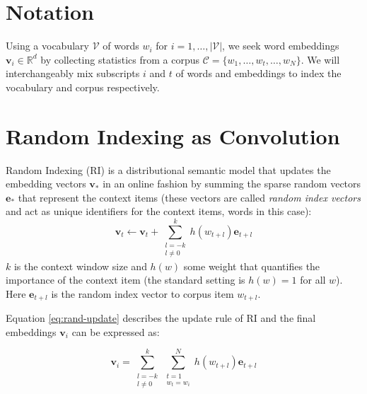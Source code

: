 \documentclass[11pt]{article}
\begin{document}
\section{Notation}

Using a vocabulary $\mathcal{V}$ of words $w_i$ for $i=1,\dots,|\mathcal{V}|$, we seek word embeddings $\textbf{v}_i \in \mathbb{R}^d$ by collecting statistics from a corpus $\mathcal{C} = \{w_1, \dots, w_t, \dots, w_N\}$. We will interchangeably mix subscripts $i$ and $t$ of words and embeddings to index the vocabulary and corpus respectively.

\section{Random Indexing as Convolution}

Random Indexing (RI) \cite{Kanerva:2000,Kanerva:2009} is a distributional semantic model that updates the embedding vectors $\textbf{v}_*$ in an online fashion by summing the sparse random vectors $\textbf{e}_*$ that represent the context items (these vectors are called {\em random index vectors} and act as unique identifiers for the context items, words in this case):
\begin{equation}
    \label{eq:rand-update}
    \textbf{v}_t \leftarrow \textbf{v}_t + \sum_{\substack{l = -k\\l\neq 0}}^{k} h(w_{t+l})\textbf{e}_{t+l}
\end{equation}
$k$ is the context window size and $h(w)$ some weight that quantifies the importance of the context item (the standard setting is $h(w)=1$ for all $w$). Here $\textbf{e}_{t+l}$ is the random index vector to corpus item $w_{t+l}$.
%
%

Equation \eqref{eq:rand-update} describes the update rule of RI and the final embeddings $\mathbf{v}_i$ can be expressed as:

\begin{equation}
    \label{eq:rand-final}
    \textbf{v}_i = \displaystyle\sum\limits_{\substack{l = -k \\ l \neq 0}}^k\displaystyle\sum\limits_{\substack{t = 1 \\ w_t = w_i}}^N h(w_{t+l})\textbf{e}_{t+l}
\end{equation}
\end{document}
